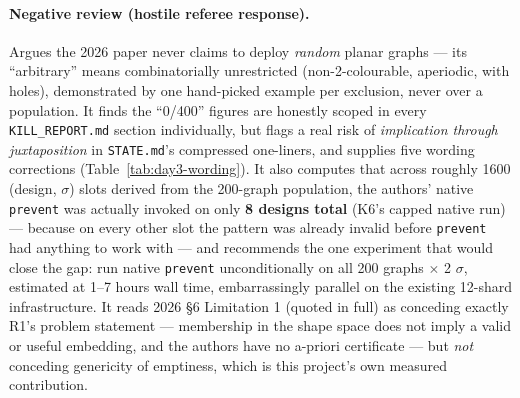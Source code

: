 \documentclass[10pt,a4paper]{article}
\newcommand{\fn}[1]{\nolinkurl{#1}}
\begin{document}
\paragraph{Negative review (hostile referee response).} Argues the 2026 paper never claims to
deploy \emph{random} planar graphs --- its ``arbitrary'' means combinatorially unrestricted
(non-2-colourable, aperiodic, with holes), demonstrated by one hand-picked example per exclusion,
never over a population. It finds the ``0/400'' figures are honestly scoped in every
\fn{KILL\_REPORT.md} section individually, but flags a real risk of \emph{implication through
juxtaposition} in \fn{STATE.md}'s compressed one-liners, and supplies five wording corrections
(Table~\ref{tab:day3-wording}). It also computes that across roughly 1600 (design, $\sigma$) slots
derived from the 200-graph population, the authors' native \fn{prevent} was actually invoked on
only \textbf{8 designs total} (K6's capped native run) --- because on every other slot the pattern
was already invalid before \fn{prevent} had anything to work with --- and recommends the one
experiment that would close the gap: run native \fn{prevent} unconditionally on all 200 graphs
$\times$ 2 $\sigma$, estimated at 1--7 hours wall time, embarrassingly parallel on the existing
12-shard infrastructure. It reads 2026 \S6 Limitation 1 (quoted in full) as conceding exactly R1's
problem statement --- membership in the shape space does not imply a valid or useful embedding,
and the authors have no a-priori certificate --- but \emph{not} conceding genericity of emptiness,
which is this project's own measured contribution.
\end{document}
